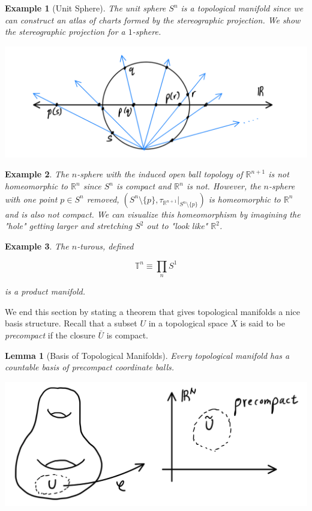 \documentclass{article}
\newtheorem{lemma}[theorem]{Lemma}
\newtheorem{example}{Example}[section]
\theoremstyle{remark}
\theoremstyle{definition}
\begin{document}
    \begin{example}[Unit Sphere]
      The unit sphere $S^n$ is a topological manifold since we can construct an atlas of charts formed by the stereographic projection. We show the stereographic projection for a $1$-sphere. 

      \begin{center}
        \includegraphics[scale=0.25]{img/1_dim_Stereographic_Projection.PNG}
      \end{center}
    \end{example}

    \begin{example}
      The $n$-sphere with the induced open ball topology of $\mathbb{R}^{n+1}$ is not homeomorphic to $\mathbb{R}^{n}$ since $S^{n}$ is compact and $\mathbb{R}^{n}$ is not. However, the $n$-sphere with one point $p \in S^{n}$ removed, $(S^{n} \setminus{\{p\}}, \tau_{\mathbb{R}^{n+1}} |_{S^{n} \setminus{\{p\}}})$ \textit{is} homeomorphic to $\mathbb{R}^{n}$ and is also not compact. We can visualize this homeomorphism by imagining the "hole" getting larger and stretching $S^{2}$ out to "look like" $\mathbb{R}^{2}$.
    \end{example}

    \begin{example}
      The $n$-turous, defined

        \[\mathbb{T}^n \equiv \prod_n S^1\]

      is a product manifold. 
    \end{example}

    We end this section by stating a theorem that gives topological manifolds a nice basis structure. Recall that a subset $U$ in a topological space $X$ is said to be \textit{precompact} if the closure $\bar{U}$ is compact. 

    \begin{lemma}[Basis of Topological Manifolds]
      Every topological manifold has a countable basis of precompact coordinate balls. 
      \begin{center}
        \includegraphics[scale=0.23]{img/Precompact_Basis.PNG}
      \end{center}
    \end{lemma}
\end{document}
